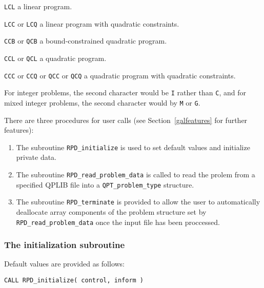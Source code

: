 \documentclass{galahad}
\newcommand{\packagename}{RPD}
\begin{document}
\begin{description}
\begin{description}
     \item {\tt LCL}              a linear program.
     \item {\tt LCC} or {\tt LCQ} a linear program with quadratic constraints.
     \item {\tt CCB} or {\tt QCB} a bound-constrained quadratic program.
     \item {\tt CCL} or {\tt QCL} a quadratic program.
     \item {\tt CCC} or {\tt CCQ} or {\tt QCC} or {\tt QCQ}
           a quadratic program with quadratic constraints.
\end{description}
For integer problems, the second character would be {\tt I} rather
than {\tt C}, and for mixed integer problems, the second character
would by {\tt M} or {\tt G}.

\end{description}


\galarguments
There are three procedures for user calls
(see Section~\ref{galfeatures} for further features):

\begin{enumerate}
\item The subroutine
      {\tt \packagename\_initialize}
      is used to set default values and initialize private data.
\item The subroutine
      {\tt \packagename\_read\_problem\_data}
      is called to read the prolem from a specified
      QPLIB file into a {\tt QPT\_problem\_type} structure.
\item The subroutine
      {\tt \packagename\_terminate}
      is provided to allow the user to automatically deallocate array
       components of the problem structure set by
       {\tt \packagename\_read\_problem\_data} once
       the input file has been proccessed.
\end{enumerate}


\subsubsection{The initialization subroutine}\label{subinit}
 Default values are provided as follows:

\hskip0.5in
{\tt CALL \packagename\_initialize( control, inform )}
\end{document}
